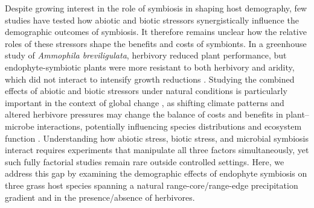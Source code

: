 \documentclass[12pt]{article}\usepackage[]{graphicx}\usepackage[dvipsnames]{xcolor}
\begin{document}
Despite growing interest in the role of symbiosis in shaping host demography, few studies have tested how abiotic and biotic stressors synergistically influence the demographic outcomes of symbiosis. 
It therefore remains unclear how the relative roles of these stressors shape the benefits and costs of symbionts. 
In a greenhouse study of \emph{Ammophila breviligulata}, herbivory reduced  plant performance, but endophyte-symbiotic plants were more resistant to both 
herbivory and aridity, which did not interact to intensify growth reductions  \citep{emery2010variation}.
Studying the combined effects of abiotic and biotic stressors under natural conditions is particularly important in the context of global change \citep{louthan2015and}, as shifting climate patterns and altered herbivore pressures may change the balance of costs and benefits in plant–microbe interactions, potentially influencing species distributions and ecosystem function \citep{reynolds2003grassroots}.
Understanding how abiotic stress, biotic stress, and microbial symbiosis interact requires experiments that manipulate all three factors simultaneously, yet such fully factorial studies remain rare outside controlled settings.
Here, we address this gap by examining the demographic effects of endophyte symbiosis on three grass host species spanning a natural range-core/range-edge precipitation gradient and in the presence/absence of herbivores.
\end{document}

